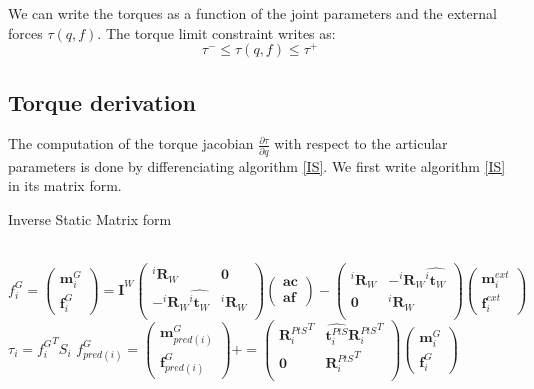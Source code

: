 We can write the torques as a function of the joint parameters and the external forces $\tau(q,f)$.
The torque limit constraint writes as:
\begin{equation}
  \tau^- \leq \tau(q,f) \leq \tau^+
\end{equation}

\subsection{Torque derivation}

The computation of the torque jacobian $\frac{\partial \tau}{\partial q}$ with respect to the articular parameters is done by differenciating algorithm \ref{IS}.
We first write algorithm \ref{IS} in its matrix form.

\begin{algorithm}
  \caption{Inverse Static Matrix form}
  \label{ISmatrix}
\begin{algorithmic}
  \\
  $f^G_i =
  \begin{pmatrix}
    \mathbf{m}^{G}_i \\ \mathbf{f}^{G}_i
  \end{pmatrix}
  =
  \mathbf{I}^W
  \begin{pmatrix}
    {{}^i\mathbf{R}_W} & \mathbf{0} \\
    -{{}^i\mathbf{R}_W}\widehat{{}^i\mathbf{t}_W} & {{}^i\mathbf{R}_W} \\
  \end{pmatrix}
  \begin{pmatrix}
    \mathbf{ac} \\ \mathbf{af}
  \end{pmatrix}
  -
  \begin{pmatrix}
    {{}^i\mathbf{R}_W} & -{{}^i\mathbf{R}_W}\widehat{{}^i\mathbf{t}_W} \\
    \mathbf{0} & {{}^i\mathbf{R}_W} \\
  \end{pmatrix}
  \begin{pmatrix}
    \mathbf{m}^{ext}_i \\ \mathbf{f}^{ext}_i
  \end{pmatrix}
  $
  \EndFor
  \State $\tau_i = {f^G_i}^T S_i$
  \State $f^G_{pred(i)} =
  \begin{pmatrix}
    \mathbf{m}^{G}_{pred(i)} \\ \mathbf{f}^{G}_{pred(i)}
  \end{pmatrix}
  +=
  \begin{pmatrix}
    {\mathbf{R}^{PtS}_i}^T & \widehat{\mathbf{t}^{PtS}_i}{\mathbf{R}^{PtS}_i}^T \\
    \mathbf{0} & {\mathbf{R}^{PtS}_i}^T \\
  \end{pmatrix}
  \begin{pmatrix}
    \mathbf{m}^{G}_i \\ \mathbf{f}^{G}_i
  \end{pmatrix}
  $
  \EndIf
  \EndFor
\end{algorithmic}
\end{algorithm}


